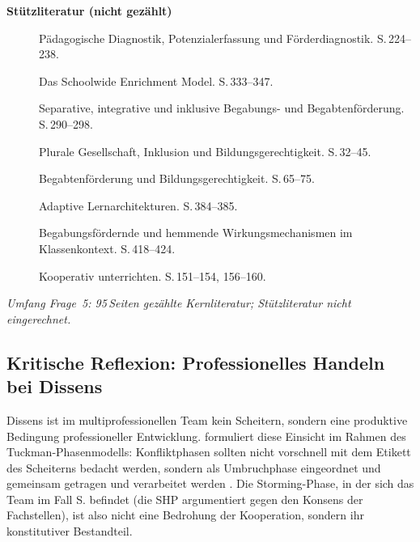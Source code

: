 \documentclass[ngerman, a4paper]{article}
\begin{document}
\textbf{Stützliteratur (nicht gezählt)}
\begin{description}
  \item[\cite{muelleroppliger2021paeddiagnostik}] Pädagogische Diagnostik,
        Potenzialerfassung und Förderdiagnostik. S.\,224--238.

  \item[\cite{reisrenzullimueller2021sem}] Das Schoolwide Enrichment Model.
        S.\,333--347.

  \item[\cite{weigand2021separativ}] Separative, integrative und inklusive
        Begabungs- und Begabtenförderung. S.\,290--298.

  \item[\cite{muelleroppliger2021plurale}] Plurale Gesellschaft, Inklusion
        und Bildungsgerechtigkeit. S.\,32--45.
  \item[\cite{sedmak2021bildungsgerechtigkeit}] Begabtenförderung und
        Bildungsgerechtigkeit. S.\,65--75.
  \item[\cite{muelleroppliger2021adaptive}] Adaptive Lernarchitekturen.
        S.\,384--385.
  \item[\cite{wagener2021bfhemmendfoerdernd}] Begabungsfördernde und
        hemmende Wirkungsmechanismen im Klassenkontext. S.\,418--424.
  \item[\cite{kummerwyss2017kooperativunterrichten}] Kooperativ
        unterrichten. S.\,151--154, 156--160.
\end{description}

\textit{Umfang Frage~5: 95\,Seiten gezählte Kernliteratur; Stützliteratur nicht eingerechnet.}



\subsection{Kritische Reflexion: Professionelles Handeln bei Dissens}

Dissens ist im multiprofessionellen Team kein Scheitern, sondern eine
produktive Bedingung professioneller Entwicklung.
\textcite[S.\,153]{kummerwyss2017kooperativunterrichten} formuliert diese
Einsicht im Rahmen des Tuckman-Phasenmodells: Konfliktphasen sollten nicht
vorschnell mit dem Etikett des Scheiterns bedacht werden, sondern als
Umbruchphase eingeordnet und gemeinsam getragen und verarbeitet werden
\parencite[vgl.][S.\,153]{kummerwyss2017kooperativunterrichten}. Die
Storming-Phase, in der sich das Team im Fall S. befindet (die SHP argumentiert
gegen den Konsens der Fachstellen), ist also nicht eine Bedrohung der
Kooperation, sondern ihr konstitutiver Bestandteil.
\end{document}
